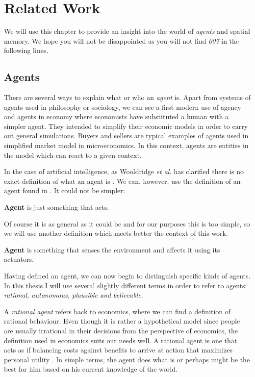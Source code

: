 \chapter{Related Work}

We will use this chapter to provide an insight into the world of \emph{agents} and spatial memory. We hope you will not be disappointed as you will not find \textit{007} in the following lines.

\section{Agents}

There are several ways to explain what or who an \emph{agent} is. Apart from systems of agents used in philosophy or sociology, we can see a first modern use of agency and agents in economy where economists have substituted a human with a simpler agent. They intended to simplify their economic models in order to carry out general simulations. Buyers and sellers are typical examples of agents used in simplified market model in microeconomics. In this context, agents are entities in the model which can react to a given context.

In the case of artificial intelligence, as Wooldridge \textit{et al.} has clarified there is no exact definition of what an agent is \cite{Wooldridge:intelligentagents}.  We can, however, use the definition of an agent found in \cite{russel2003ai}. It could not be simpler:

\begin{definition}{\bf Agent} is just something that acts.
\end{definition} 

Of course it is as general as it could be and for our purposes this is too simple, so we will use another definition which meets better the context of this work.

\begin{definition}{\bf Agent} is something that senses the environment and affects it using its actuators.
\end{definition} 

Having defined an agent, we can now begin to distinguish specific kinds of agents. In this thesis I will use several slightly different terms in order to refer to agents: \emph{rational, autonomous, plausible and believable}. 

A \emph{rational agent} refers back to economics, where we can find a definition of rational behaviour. Even though it is rather a hypothetical model since people are usually irrational in their decisions from the perspective of economics, the definition used in economics suits our needs well. A rational agent is one that acts as if balancing costs against benefits to arrive at action that maximizes personal utility \cite{Milton:positiveeconomics}. In simple terms, the agent does what is or perhaps might be the best for him based on his current knowledge of the world.
 
